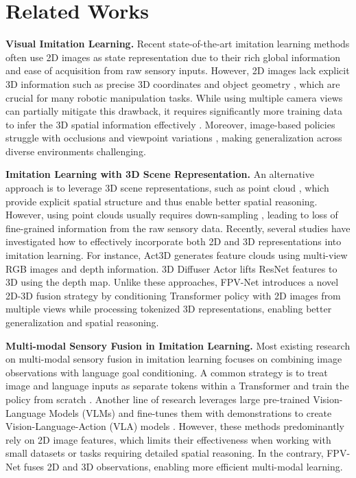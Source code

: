 
\section{Related Works}
\label{sec:related_works}

\textbf{Visual Imitation Learning.}
Recent state-of-the-art imitation learning methods \cite{chi2023diffusion,reuss2024efficient, kim24openvla,liu2024rdt,li2025gr} often use 2D images as state representation due to their rich global information and ease of acquisition from raw sensory inputs. However, 2D images lack explicit 3D information such as precise 3D coordinates and object geometry \cite{zhu2024point}, which are crucial for many robotic manipulation tasks. While using multiple camera views can partially mitigate this drawback, it requires significantly more training data to infer the 3D spatial information effectively \cite{ze20243d}. Moreover, image-based policies struggle with occlusions and viewpoint variations \cite{peri2024point}, making generalization across diverse environments challenging.

\textbf{Imitation Learning with 3D Scene Representation.}
An alternative approach is to leverage 3D scene representations, such as point cloud \cite{zhu2024point, ze20243d, ke20243d}, which provide explicit spatial structure and thus enable better spatial reasoning. However, using point clouds usually requires down-sampling \cite{eldar1994farthest}, leading to loss of fine-grained information from the raw sensory data. 
Recently, several studies \cite{shridhar2023perceiver, gervet2023act3d, ke20243d} have investigated how to effectively incorporate both 2D and 3D representations into imitation learning. For instance, Act3D \cite{gervet2023act3d} generates feature clouds using multi-view RGB images and depth information. 3D Diffuser Actor \cite{ke20243d} lifts ResNet features to 3D using the depth map. Unlike these approaches, FPV-Net introduces a novel 2D-3D fusion strategy by conditioning Transformer policy with 2D images from multiple views while processing tokenized 3D representations, enabling better generalization and spatial reasoning.

\textbf{Multi-modal Sensory Fusion in Imitation Learning.}
Most existing research on multi-modal sensory fusion in imitation learning focuses on combining image observations with language goal conditioning. A common strategy is to treat image and language inputs as separate tokens within a Transformer and train the policy from scratch \cite{reuss2024multimodal, bharadhwaj2024roboagent}. Another line of research leverages large pre-trained Vision-Language Models (VLMs) and fine-tunes them with demonstrations to create Vision-Language-Action (VLA) models \cite{cheang2024gr, kim24openvla, black2024pi_0}. However, these methods predominantly rely on 2D image features, which limits their effectiveness when working with small datasets or tasks requiring detailed spatial reasoning. In the contrary, FPV-Net fuses 2D and 3D observations, enabling more efficient multi-modal learning.



